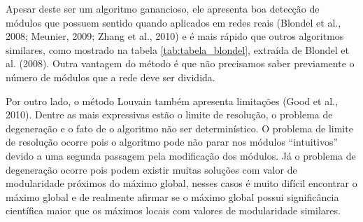\documentclass[
  12pt,
]{article}
\begin{document}
Apesar deste ser um algoritmo ganancioso, ele apresenta boa detecção de
módulos que possuem sentido quando aplicados em redes reais (Blondel et
al., 2008; Meunier, 2009; Zhang et al., 2010) e é mais rápido que outros
algoritmos similares, como mostrado na tabela \ref{tab:tabela_blondel},
extraída de Blondel et al. (2008). Outra vantagem do método é que não
precisamos saber previamente o número de módulos que a rede deve ser
dividida.

\begin{table}[h!]
  \caption{Extraído de Blondel et al. (2008). Comparação entre os tempos computacionais dos algoritmos Clauset et al (CNM), Pons e Latapy (PL), Wakita e Tsurumi (WT) e Louvain (LV). Os resultados mostram a modularidade obtida e o tempo computacional para cada rede/método. Células em branco representam tempos computacionais maiores que 24 horas.}
  \label{tab:tabela_blondel}
  \centering
\end{table}

Por outro lado, o método Louvain também apresenta limitações (Good et
al., 2010). Dentre as mais expressivas estão o limite de resolução, o
problema de degeneração e o fato de o algoritmo não ser determinístico.
O problema de limite de resolução ocorre pois o algoritmo pode não parar
nos módulos ``intuitivos'' devido a uma segunda passagem pela
modificação dos módulos. Já o problema de degeneração ocorre pois podem
existir muitas soluções com valor de modularidade próximos do máximo
global, nesses casos é muito difícil encontrar o máximo global e de
realmente afirmar se o máximo global possui significância científica
maior que os máximos locais com valores de modularidade similares.
\end{document}

